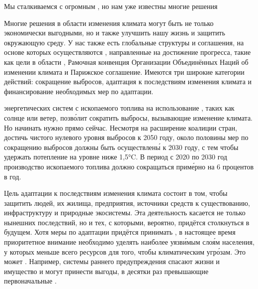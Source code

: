 \begin{fancyquotes}
    Мы сталкиваемся с огромным , но нам уже известны многие решения
\end{fancyquotes}

Многие решения в области изменения климата могут быть не только экономически выгодными, но и также улучшить нашу жизнь и защитить окружающую среду. У нас также есть глобальные структуры и соглашения, на основе которых осуществляются , направленные на достижение прогресса, такие как цели в области , Рамочная конвенция Организации Объединённых Наций об изменении климата и Парижское соглашение. Имеются три широкие категории действий: сокращение выбросов, адаптация к последствиям изменения климата и финансирование необходимых мер по адаптации.

 энергетических систем с ископаемого топлива на использование , таких как солнце или ветер, позв\'{о}лит сократить выбросы, вызывающие изменение климата. Но начинать нужно прямо сейчас. Несмотря на расширение коалиции стран,  достичь чистого нулевого уровня выбросов к 2050 году, около половины мер по сокращению выбросов должны быть осуществлен\'{ы} к 2030 году, с тем чтобы удержать потепление на уровне ниже 1,5°C. В период с 2020 по 2030 год производство ископаемого топлива должно сокращаться прим\'{е}рно на 6 процентов в год.

Цель адаптации к последствиям изменения климата состоит в том, чтобы защитить людей, их жилища, предприятия, источники средств к существованию, инфраструктуру и природные экосистемы. Эта деятельность касается не только нынешних последствий, но и тех, с которыми, вероятно, придётся столкнуться в будущем. Хотя меры по адаптации придётся принимать , в настоящее время приоритетное внимание необходимо уделять наиболее уязв\'{и}мым сло\'{я}м населения, у которых меньше всего ресурсов для того, чтобы  климатическим угр\'{о}зам. Это может  . Например, системы раннего предупреждения  спасают жизни и имущество и могут принести выгоды, в десятки раз превышающие первоначальные .

